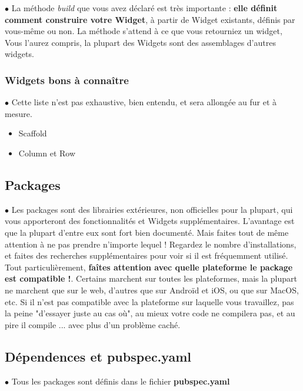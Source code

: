 \par $\bullet$ La méthode \textit{build} que vous avez déclaré est très importante : \textbf{elle définit comment construire votre Widget}, à partir de Widget existants, définis par vous-même ou non. La méthode s'attend à ce que vous retourniez un widget, Vous l'aurez compris, la plupart des Widgets sont des assemblages d'autres widgets.

\subsubsection{Widgets bons à connaître}
\par $\bullet$ Cette liste n'est pas exhaustive, bien entendu, et sera allongée au fur et à mesure.
\begin{itemize}
  \item Scaffold
  \item Column et Row
\end{itemize}

\subsection{Packages}
\par $\bullet$ Les packages sont des librairies extérieures, non officielles pour la plupart, qui vous apporteront des fonctionnalités et Widgets supplémentaires. L'avantage est que la plupart d'entre eux sont fort bien documenté. Mais faites tout de même attention à ne pas prendre n'importe lequel ! Regardez le nombre d'installations, et faites des recherches supplémentaires pour voir si il est fréquemment utilisé. \\
Tout particulièrement, \textbf{faîtes attention avec quelle plateforme le package est compatible !}. Certains marchent sur toutes les plateformes, mais la plupart ne marchent que sur le web, d'autres que sur Androïd et iOS, ou que sur MacOS, etc. Si il n'est pas compatible avec la plateforme sur laquelle vous travaillez, pas la peine "d'essayer juste au cas où", au mieux votre code ne compilera pas, et au pire il compile ... avec plus d'un problème caché.

\subsection{Dépendences et pubspec.yaml}
\par $\bullet$ Tous les packages sont définis dans le fichier \textbf{pubspec.yaml}


